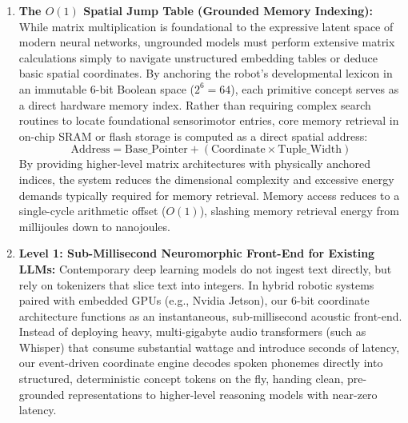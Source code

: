 \documentclass[journal,twocolumn]{IEEEtran}
\begin{document}
\begin{enumerate}
    \item \textbf{The $O(1)$ Spatial Jump Table (Grounded Memory Indexing):} While matrix multiplication is foundational to the expressive latent space of modern neural networks, ungrounded models must perform extensive matrix calculations simply to navigate unstructured embedding tables or deduce basic spatial coordinates. By anchoring the robot's developmental lexicon in an immutable 6-bit Boolean space ($2^6 = 64$), each primitive concept serves as a direct hardware memory index. Rather than requiring complex search routines to locate foundational sensorimotor entries, core memory retrieval in on-chip SRAM or flash storage is computed as a direct spatial address:
    \begin{equation}
    \text{Address} = \text{Base\_Pointer} + (\text{Coordinate} \times \text{Tuple\_Width})
    \end{equation}
    By providing higher-level matrix architectures with physically anchored indices, the system reduces the dimensional complexity and excessive energy demands typically required for memory retrieval. Memory access reduces to a single-cycle arithmetic offset ($O(1)$), slashing memory retrieval energy from millijoules down to nanojoules.

    \item \textbf{Level 1: Sub-Millisecond Neuromorphic Front-End for Existing LLMs:} Contemporary deep learning models do not ingest text directly, but rely on tokenizers that slice text into integers. In hybrid robotic systems paired with embedded GPUs (e.g., Nvidia Jetson), our 6-bit coordinate architecture functions as an instantaneous, sub-millisecond acoustic front-end. Instead of deploying heavy, multi-gigabyte audio transformers (such as Whisper) that consume substantial wattage and introduce seconds of latency, our event-driven coordinate engine decodes spoken phonemes directly into structured, deterministic concept tokens on the fly, handing clean, pre-grounded representations to higher-level reasoning models with near-zero latency.


\end{enumerate}
\end{document}
